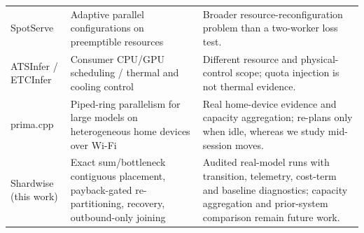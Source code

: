 \begin{table}[p]
\begin{tabular}{>{\raggedright\arraybackslash}p{.19\linewidth}>{\raggedright\arraybackslash}p{.35\linewidth}>{\raggedright\arraybackslash}p{.35\linewidth}}
SpotServe \cite{miao2023spotserve} & Adaptive parallel configurations on preemptible resources & Broader resource-reconfiguration problem than a two-worker loss test.\\
ATSInfer / ETCInfer \cite{liu2026atsinfer,lu2026etcinfer} & Consumer CPU/GPU scheduling / thermal and cooling control & Different resource and physical-control scope; quota injection is not thermal evidence.\\
prima.cpp \cite{prima2026} & Piped-ring parallelism for large models on heterogeneous home devices over Wi-Fi & Real home-device evidence and capacity aggregation; re-plans only when idle, whereas we study mid-session moves.\\
Shardwise (this work) & Exact sum/bottleneck contiguous placement, payback-gated re-partitioning, recovery, outbound-only joining & Audited real-model runs with transition, telemetry, cost-term and baseline diagnostics; capacity aggregation and prior-system comparison remain future work.\\
\bottomrule
\end{tabular}
\end{table}
